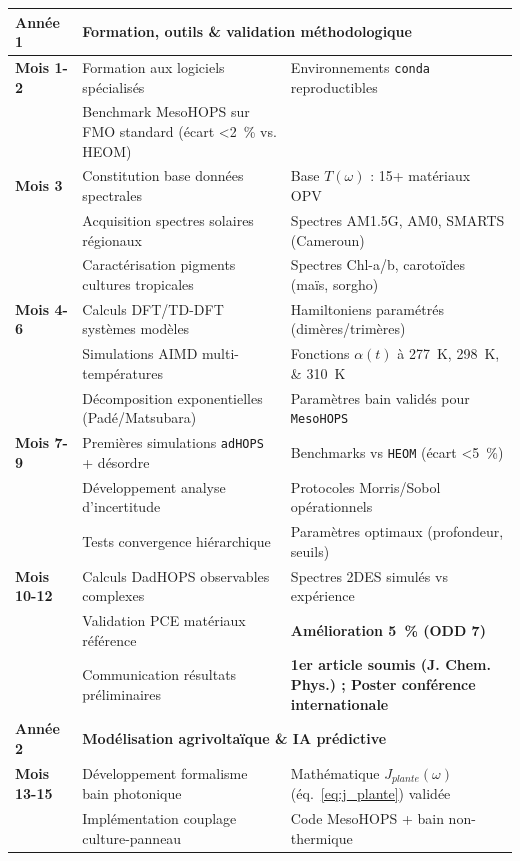 \documentclass[12pt, a4paper]{article}
\begin{document}
\begin{longtable}{@{}lp{}p{}@{}}
    \textbf{Année 1} & \multicolumn{2}{l}{\textbf{Formation, outils \& validation méthodologique}} \\
    \midrule
    \textbf{Mois 1-2} & Formation aux logiciels spécialisés & Environnements \texttt{conda} reproductibles \\
     & Benchmark MesoHOPS sur FMO standard (écart \SI{<2}{\percent} vs. HEOM) & \\
    \midrule
    \textbf{Mois 3} & Constitution base données spectrales & Base $T(\omega)$ : 15+ matériaux OPV \\
     & Acquisition spectres solaires régionaux & Spectres AM1.5G, AM0, SMARTS (Cameroun) \\
     & Caractérisation pigments cultures tropicales & Spectres Chl-a/b, carotoïdes (maïs, sorgho) \\
    \midrule
    \textbf{Mois 4-6} & Calculs DFT/TD-DFT systèmes modèles & Hamiltoniens paramétrés (dimères/trimères) \\
     & Simulations AIMD multi-températures & Fonctions $\alpha(t)$ à \SIlist{277;298;310}{\kelvin} \\
     & Décomposition exponentielles (Padé/Matsubara) & Paramètres bain validés pour \texttt{MesoHOPS} \\
    \midrule
    \textbf{Mois 7-9} & Premières simulations \texttt{adHOPS} + désordre & Benchmarks vs \texttt{HEOM} (écart \SI{<5}{\percent}) \\
     & Développement analyse d'incertitude & Protocoles Morris/Sobol opérationnels \\
     & Tests convergence hiérarchique & Paramètres optimaux (profondeur, seuils) \\
    \midrule
    \textbf{Mois 10-12} & Calculs DadHOPS observables complexes & Spectres 2DES simulés vs expérience \\
     & Validation PCE matériaux référence & \textbf{Amélioration \SI{+5}{\percent} (ODD 7)} \\
     & Communication résultats préliminaires & \textbf{1er article soumis (J. Chem. Phys.) ; Poster conférence internationale} \\
    \midrule
    \textbf{Année 2} & \multicolumn{2}{l}{\textbf{Modélisation agrivoltaïque \& IA prédictive}} \\
    \midrule
    \textbf{Mois 13-15} & Développement formalisme bain photonique & Mathématique $J_{plante}(\omega)$ (éq.~\eqref{eq:j_plante}) validée \\
     & Implémentation couplage culture-panneau & Code MesoHOPS + bain non-thermique \\

\end{longtable}
\end{document}
